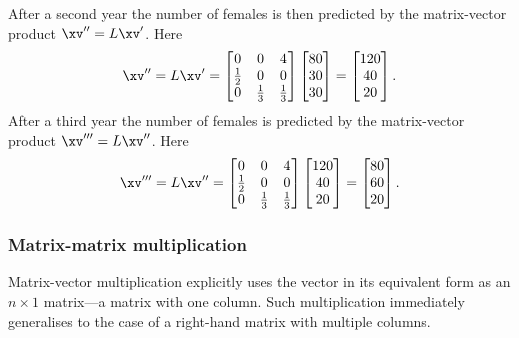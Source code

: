 \begin{example}
\begin{solution}
\begin{enumerate}
After a second year the number of females is then predicted by the matrix-vector product \(\xv''=L\xv'\).  Here
\begin{equation*}
\xv''=L\xv'=\begin{bmatrix} 0&0&4\\\frac12&0&0\\0&\frac13&\frac13 \end{bmatrix}\begin{bmatrix} 80\\30\\30 \end{bmatrix}
=\begin{bmatrix} 120\\40\\20 \end{bmatrix}.
\end{equation*}
After a third year the number of females is predicted by the matrix-vector product \(\xv'''=L\xv''\).  Here
\begin{equation*}
\xv'''=L\xv''=\begin{bmatrix} 0&0&4\\\frac12&0&0\\0&\frac13&\frac13 \end{bmatrix}\begin{bmatrix} 120\\40\\20 \end{bmatrix}
=\begin{bmatrix} 80\\60\\20 \end{bmatrix}.
\end{equation*}
\end{enumerate}
\end{solution}
\end{example}







\subsubsection{Matrix-matrix multiplication}

Matrix-vector multiplication explicitly uses the vector in its equivalent form as an \(n\times1\) matrix---a matrix with one column.
Such multiplication immediately generalises to the case of a right-hand matrix with multiple columns.

